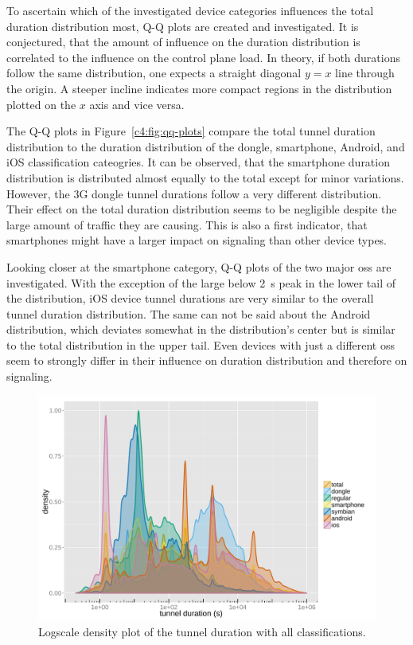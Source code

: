To ascertain which of the investigated device categories influences the total duration distribution most, Q-Q plots are created and investigated. It is conjectured, that the amount of influence on the duration distribution is correlated to the influence on the control plane load. In theory, if both durations follow the same distribution, one expects a straight diagonal $y=x$ line through the origin. A steeper incline indicates more compact regions in the distribution plotted on the $x$ axis and vice versa.

The Q-Q plots in Figure~\ref{c4:fig:qq-plots} compare the total tunnel duration distribution to the duration distribution of the dongle, smartphone, Android, and iOS classification cateogries. It can be observed, that the smartphone duration distribution is distributed almost equally to the total except for minor variations. However, the \gls{3G} dongle tunnel durations follow a very different distribution. Their effect on the total duration distribution seems to be negligible despite the  large amount of traffic they are causing. This is also a first indicator, that smartphones might have a larger impact on signaling than other device types.

Looking closer at the smartphone category, Q-Q plots of the two major \glspl{os} are investigated. With the exception of the large below \SI{2}{\second} peak in the lower tail of the distribution, iOS device tunnel durations are very similar to the overall tunnel duration distribution. The same can not be said about the Android distribution, which deviates somewhat in the distribution's center but is similar to the total distribution in the upper tail. Even devices with just a different \glspl{os} seem to strongly differ in their influence on duration distribution and therefore on signaling.

\begin{figure}[htb]
	\centering
	\includegraphics[width=1.0\textwidth]{images/R-duration-classification-density.pdf}
	\caption{Logscale density plot of the tunnel duration with all classifications.}
\label{c4:fig:durations-density}
\end{figure}


